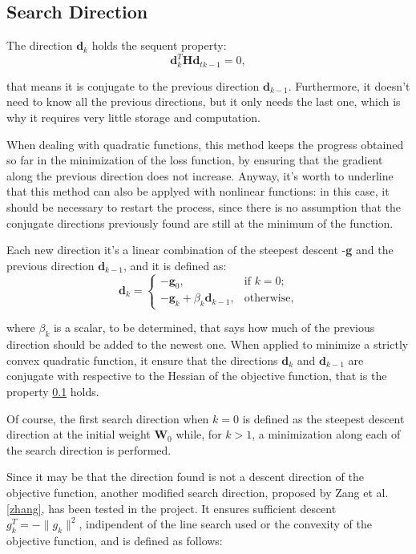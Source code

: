 		\subsection{Search Direction}
		\label{sub:search_direction}
			The direction $\textbf{d}_k$ holds the sequent property:
			\begin{equation}
			\textbf{d}_k^T\textbf{H}\textbf{d}_{tk-1} = 0,
			\end{equation}

		 	that means it is conjugate to the previous direction $\textbf{d}_{k-1}$. Furthermore, it doesn't need to know all the 	previous directions, but it only needs the last one, which is why it requires very little storage and computation.

			When dealing with quadratic functions, this method keeps the progress obtained so far in the minimization of the loss function, by ensuring that the gradient along the previous direction does not increase.
			Anyway, it's worth to underline that this method can also be applyed with nonlinear functions: in this case, it should be necessary to restart the process, since there is no assumption that the conjugate directions previously found are still at the minimum of the function.

			Each new direction it's a linear combination of the steepest descent -\textbf{g} and the previous direction $\textbf{d}_{k-1}$, and it is defined as:
			\begin{equation}
			\label{dir}
			  \textbf{d}_k=\begin{cases}
			    -\textbf{g}_0, & \text{if $k=0$};\\
			    -\textbf{g}_k + \beta_k\textbf{d}_{k-1}, & \text{otherwise,}
			  \end{cases}
			\end{equation}

			where $\beta_k$ is a scalar, to be determined, that says how much of the previous direction should be added to the newest one. When applied to minimize a strictly convex quadratic function, it ensure that the directions $\textbf{d}_{k}$ and $\textbf{d}_{k-1}$ are conjugate with respective to the Hessian of the objective function, that is the property \ref{sub:search_direction} holds.

			Of course, the first search direction when $k = 0$ is defined as the steepest descent direction at the initial weight $\textbf{W}_0$ while, for $k > 1$, a minimization along each of the search direction is performed.

			Since it may be that the direction found is not a descent direction of the objective function, another modified search direction, proposed by Zang et al.\ref{zhang}, has been tested in the project. It ensures sufficient descent $g_k^T = -\|g_k\|^2$, indipendent of the line search used or the convexity of the objective function, and is defined as follows:

